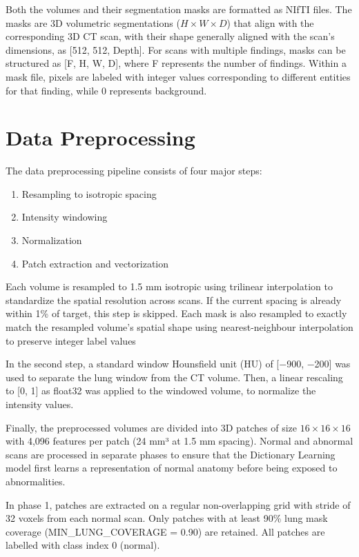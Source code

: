 Both the volumes and their segmentation masks are formatted as NIfTI files. The masks are 3D volumetric segmentations
(\(H \times W \times D\)) that align with the corresponding 3D CT scan, with their shape generally aligned with the scan's dimensions, as [512, 512, Depth].
For scans with multiple findings, masks can be structured as [F, H, W, D], where F represents the number of findings.
Within a mask file, pixels are labeled with integer values corresponding to different entities for that finding, while 0 represents background.

\section{Data Preprocessing}
The data preprocessing pipeline consists of four major steps:
\begin{enumerate}
    \item Resampling to isotropic spacing
    \item Intensity windowing
    \item Normalization
    \item Patch extraction and vectorization
\end{enumerate}

Each volume is resampled to 1.5 mm isotropic using trilinear interpolation to standardize the spatial resolution across scans.
If the current spacing is already within 1\% of target, this step is skipped.
Each mask is also resampled to exactly match the resampled volume's spatial shape using nearest-neighbour interpolation to preserve integer label values

In the second step, a standard window Hounsfield unit (HU) of [−900, −200] was used to separate the lung window from the CT volume.
Then, a linear rescaling to [0, 1] as float32 was applied to the windowed volume, to normalize the intensity values.

Finally, the preprocessed volumes are divided into 3D patches of size \(16 \times 16 \times 16\) with
4,096 features per patch (24 mm³ at 1.5 mm spacing).
Normal and abnormal scans are processed in separate phases to ensure that the Dictionary Learning model first learns a representation of normal anatomy before being exposed to abnormalities.

In phase 1, patches are extracted on a regular non-overlapping grid with stride of 32 voxels from each normal scan. 
Only patches with at least 90\% lung mask coverage (MIN\_LUNG\_COVERAGE = 0.90) are retained. 
All patches are labelled with class index 0 (normal).

